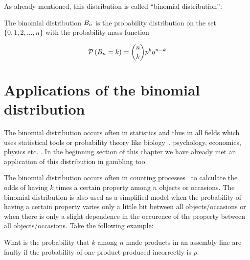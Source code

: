 As already mentioned, this distribution is called ``binomial distribution'':

\begin{definition}
  The binomial distribution $B_{n}$ is the probability distribution on the set $\{0,1,2,\ldots,n\}$ with the probability mass function

  \begin{align}
    \mathcal P\left({B_{n}=k}\right) = \binom nk p^k q^{n-k}
  \end{align}
\end{definition}


\section{Applications of the binomial distribution}

The binomial distribution occurs often in statistics and thus in all fields which uses statistical tools or probability theory like biology~\cite[p. 146]{henze}, psychology, economics, physics etc. . In the beginning section of this chapter we have already met an application of this distribution in gambling too.


The binomial distribution occurs often in counting processes~\cite[p. 138]{henze} to calculate the odds of having $k$ times a certain property among $n$ objects or occasions. The binomial distribution is also used as a simplified model when the probability of having a certain property varies only a little bit between all objects/occasions or when there is only a slight dependence in the occurence of the property between all objects/occasions. Take the following example:

\begin{example}
  What is the probability that $k$ among $n$ made products in an assembly line are faulty if the probability of one product produced incorrectly is $p$.
\end{example}

